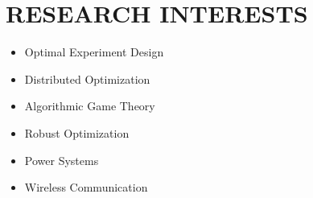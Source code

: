 \documentclass[paper=a4,fontsize=11pt]{scrartcl} %
\newcommand{\NewPart}[1]{\section*{\uppercase{#1}}}
\newcommand{\EducationEntry}[4]{
	\noindent \textbf{#1} \hfill      %
	\colorbox{White}{%
		\parbox{5cm}{%
			\hfill\color{Black}#2}} \par  %
	\noindent \textit{#3} \par        %
	\noindent\hangindent=2em\hangafter=0 \small #4 %
	\normalsize \par}
\begin{document}
		\NewPart{RESEARCH INTERESTS}{}
		\begin{itemize}
			\item{Optimal Experiment Design}
			
			\item{Distributed Optimization}
			
			\item{Algorithmic Game Theory}
			
			\item{Robust Optimization}
			
			\item{Power Systems}
			\item{Wireless Communication}
		\end{itemize}
		
\end{document}

